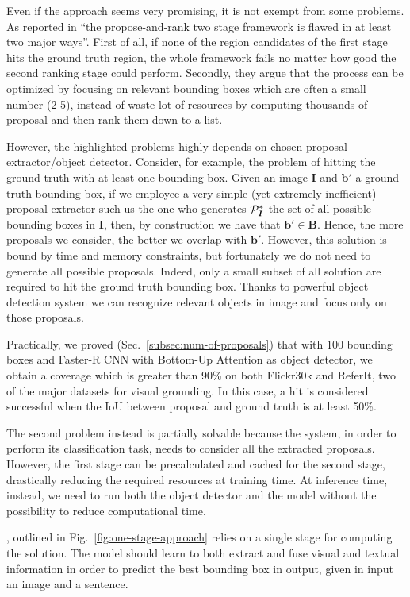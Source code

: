 Even if the approach seems very promising, it is not exempt from some
problems. As reported in \cite{yang2019fast} ``the propose-and-rank
two stage framework is flawed in at least two major ways''. First of
all, if none of the region candidates of the first stage hits the
ground truth region, the whole framework fails no matter how good the
second ranking stage could perform. Secondly, they argue that the
process can be optimized by focusing on relevant bounding boxes which
are often a small number (2-5), instead of waste lot of resources by
computing thousands of proposal and then rank them down to a list.

However, the highlighted problems highly depends on chosen proposal
extractor/object detector. Consider, for example, the problem of
hitting the ground truth with at least one bounding box. Given an
image $\bm{I}$ and $\bm{b}'$ a ground truth bounding box, if we
employee a very simple (yet extremely inefficient) proposal extractor
such us the one who generates $\mathcal{P}^*_{\bm{I}}$ the set of all
possible bounding boxes in $\bm{I}$, then, by construction we have
that $\bm{b}' \in \bm{B}$. Hence, the more proposals we consider, the
better we overlap with $\bm{b}'$. However, this solution is bound by
time and memory constraints, but fortunately we do not need to
generate all possible proposals. Indeed, only a small subset of all
solution are required to hit the ground truth bounding box. Thanks to
powerful object detection system we can recognize relevant objects in
image and focus only on those proposals.

Practically, we proved (Sec.~\ref{subsec:num-of-proposals}) that with
$100$ bounding boxes and Faster-R CNN with Bottom-Up Attention
\cite{sharma2020understanding} as object detector, we obtain a
coverage which is greater than 90\% on both Flickr30k and ReferIt, two
of the major datasets for visual grounding. In this case, a hit is
considered successful when the IoU between proposal and ground truth
is at least 50\%.

The second problem instead is partially solvable because the system,
in order to perform its classification task, needs to consider all the
extracted proposals. However, the first stage can be precalculated and
cached for the second stage, drastically reducing the required
resources at training time. At inference time, instead, we need to run
both the object detector and the model without the possibility to
reduce computational time.

, outlined in
Fig.~\ref{fig:one-stage-approach} relies on a single stage for
computing the solution. The model should learn to both extract and
fuse visual and textual information in order to predict the best
bounding box in output, given in input an image and a sentence. 

